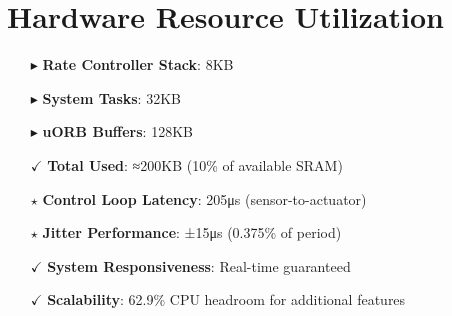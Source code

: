 \documentclass[landscape,a4paper]{article}
\begin{document}
\section{Hardware Resource Utilization}

\begin{tcolorbox}[colback=px4orange!5,colframe=px4orange,width=\textwidth,arc=2mm,boxrule=1.5pt,title=\textbf{Memory Usage (2MB SRAM)},fonttitle=\bfseries]
\begin{itemize}[leftmargin=1em]
    \item[\color{px4orange}$\blacktriangleright$] \textbf{Rate Controller Stack}: 8KB
    \item[\color{px4orange}$\blacktriangleright$] \textbf{System Tasks}: 32KB
    \item[\color{px4orange}$\blacktriangleright$] \textbf{uORB Buffers}: 128KB
    \item[\color{px4green}$\checkmark$] \textbf{Total Used}: ≈200KB (10\% of available SRAM)
\end{itemize}
\end{tcolorbox}

\begin{tcolorbox}[colback=px4blue!5,colframe=px4blue,width=\textwidth,arc=2mm,boxrule=1.5pt,title=\textbf{Performance Characteristics},fonttitle=\bfseries]
\begin{itemize}[leftmargin=1em]
    \item[\color{px4blue}$\star$] \textbf{Control Loop Latency}: 205μs (sensor-to-actuator)
    \item[\color{px4blue}$\star$] \textbf{Jitter Performance}: ±15μs (0.375\% of period)
    \item[\color{px4green}$\checkmark$] \textbf{System Responsiveness}: Real-time guaranteed
    \item[\color{px4green}$\checkmark$] \textbf{Scalability}: 62.9\% CPU headroom for additional features
\end{itemize}
\end{tcolorbox}
\end{document}
